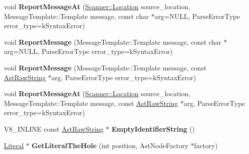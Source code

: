 \begin{DoxyCompactItemize}
\item 
void {\bfseries Report\+Message\+At} (\hyperlink{structv8_1_1internal_1_1_scanner_1_1_location}{Scanner\+::\+Location} source\+\_\+location, Message\+Template\+::\+Template message, const char $\ast$arg=N\+U\+LL, Parse\+Error\+Type error\+\_\+type=k\+Syntax\+Error)\hypertarget{classv8_1_1internal_1_1_parser_traits_a8d7eca3d0c28744a7f29a393448a9e03}{}\label{classv8_1_1internal_1_1_parser_traits_a8d7eca3d0c28744a7f29a393448a9e03}

\item 
void {\bfseries Report\+Message} (Message\+Template\+::\+Template message, const char $\ast$arg=N\+U\+LL, Parse\+Error\+Type error\+\_\+type=k\+Syntax\+Error)\hypertarget{classv8_1_1internal_1_1_parser_traits_ae549219aeda1173c30f9235529e4bb5b}{}\label{classv8_1_1internal_1_1_parser_traits_ae549219aeda1173c30f9235529e4bb5b}

\item 
void {\bfseries Report\+Message} (Message\+Template\+::\+Template message, const \hyperlink{classv8_1_1internal_1_1_ast_raw_string}{Ast\+Raw\+String} $\ast$arg, Parse\+Error\+Type error\+\_\+type=k\+Syntax\+Error)\hypertarget{classv8_1_1internal_1_1_parser_traits_ab6d6687aedb010cde41cf22ae1851384}{}\label{classv8_1_1internal_1_1_parser_traits_ab6d6687aedb010cde41cf22ae1851384}

\item 
void {\bfseries Report\+Message\+At} (\hyperlink{structv8_1_1internal_1_1_scanner_1_1_location}{Scanner\+::\+Location} source\+\_\+location, Message\+Template\+::\+Template message, const \hyperlink{classv8_1_1internal_1_1_ast_raw_string}{Ast\+Raw\+String} $\ast$arg, Parse\+Error\+Type error\+\_\+type=k\+Syntax\+Error)\hypertarget{classv8_1_1internal_1_1_parser_traits_a36f4d99e5905c1955e497e753dd9afd2}{}\label{classv8_1_1internal_1_1_parser_traits_a36f4d99e5905c1955e497e753dd9afd2}

\item 
V8\+\_\+\+I\+N\+L\+I\+NE const \hyperlink{classv8_1_1internal_1_1_ast_raw_string}{Ast\+Raw\+String} $\ast$ {\bfseries Empty\+Identifier\+String} ()\hypertarget{classv8_1_1internal_1_1_parser_traits_ae1b7fd1a5cc960789abd70756a8ef71b}{}\label{classv8_1_1internal_1_1_parser_traits_ae1b7fd1a5cc960789abd70756a8ef71b}

\item 
\hyperlink{classv8_1_1internal_1_1_literal}{Literal} $\ast$ {\bfseries Get\+Literal\+The\+Hole} (int position, Ast\+Node\+Factory $\ast$factory)\hypertarget{classv8_1_1internal_1_1_parser_traits_afbaf13f4a9d483f8894de7e82d0dea0b}{}\label{classv8_1_1internal_1_1_parser_traits_afbaf13f4a9d483f8894de7e82d0dea0b}


\end{DoxyCompactItemize}

